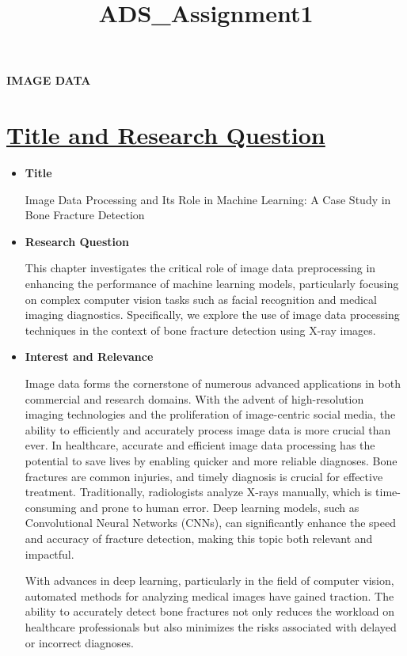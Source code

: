 \documentclass[11pt]{article}
\title{ADS\_Assignment1}
\begin{document}
    
    \maketitle
    
    

    
    \begin{center}
    \Large\textbf{IMAGE DATA}
    \end{center}

     
\section*{\Large\underline{\textbf{Title and Research Question}}}\label{references}


\begin{itemize}
    \item \textbf{Title} 
    
    Image Data Processing and Its Role in Machine Learning: A Case Study in Bone Fracture Detection

    \item \textbf{Research Question}
    
    This chapter investigates the critical role of image data preprocessing
    in enhancing the performance of machine learning models, particularly
    focusing on complex computer vision tasks such as facial recognition and
    medical imaging diagnostics. Specifically, we explore the use of image
    data processing techniques in the context of bone fracture detection
    using X-ray images.

    \item \textbf{Interest and Relevance} 
    
    Image data forms the cornerstone of numerous advanced applications in
    both commercial and research domains. With the advent of high-resolution
    imaging technologies and the proliferation of image-centric social media, the ability to efficiently and accurately process image data is more crucial than ever. In healthcare, accurate and efficient image data processing has the potential to save lives by enabling quicker and more reliable diagnoses. Bone fractures are common injuries, and timely diagnosis is crucial for effective treatment. Traditionally, radiologists analyze X-rays manually, which is time-consuming and prone to human error. Deep learning models, such as Convolutional Neural Networks (CNNs), can significantly enhance the speed and accuracy of fracture detection, making this topic both relevant and impactful. 
    
    With advances in deep learning, particularly in the field of computer vision, automated methods for analyzing medical images have gained traction. The ability to accurately detect bone fractures not only reduces the workload on healthcare professionals but also minimizes the risks associated with delayed or incorrect diagnoses.
\end{itemize}
\end{document}
